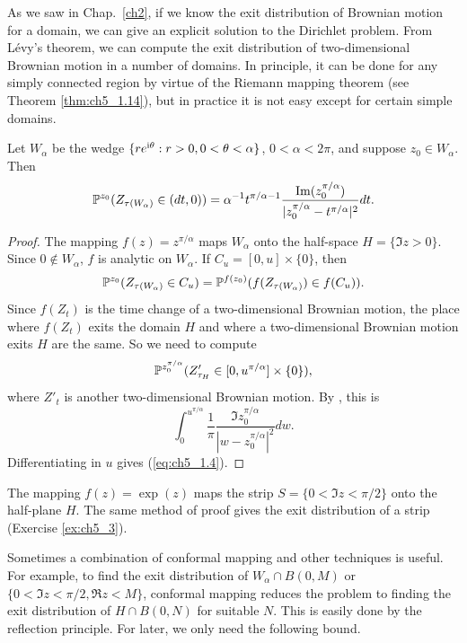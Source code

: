 

As we saw in Chap.\ \ref{ch2}, if we know the exit distribution of Brownian motion for a domain, we can give an explicit solution to the Dirichlet problem. From L\'evy's theorem, we can compute the exit distribution of two-dimensional Brownian motion in a number of domains. In principle, it can be done for any simply connected region by virtue of the Riemann mapping theorem (see Theorem \ref{thm:ch5_1.14}), but in practice it is not easy except for certain simple domains.

\begin{proposition}\label{prop:ch5_1.4}
Let $W_\alpha$ be the wedge $\{re^{\im\theta} : r > 0, 0 < \theta < \alpha\}$, $0 < \alpha < 2\pi$, and suppose $z_0 \in W_\alpha$. Then
\begin{equation}\label{eq:ch5_1.4}
    \P^{z_0}(Z_{\tau(W_\alpha)} \in (dt,0)) = \alpha^{-1}t^{\pi/\alpha-1}\frac{\Im(z_0^{\pi/\alpha})}{|z_0^{\pi/\alpha} - t^{\pi/\alpha}|^2}dt.
\end{equation}
\end{proposition}

\begin{proof}
The mapping $f(z) = z^{\pi/\alpha}$ maps $W_\alpha$ onto the half-space $H = \{\Im z > 0\}$. Since $0 \notin W_\alpha$, $f$ is analytic on $W_\alpha$. If $C_u = [0,u] \times \{0\}$, then
\[
    \P^{z_0}(Z_{\tau(W_\alpha)} \in C_u) = \P^{f(z_0)}(f(Z_{\tau(W_\alpha)}) \in f(C_u)).
\]
Since $f(Z_t)$ is the time change of a two-dimensional Brownian motion, the place where $f(Z_t)$ exits the domain $H$ and where a two-dimensional Brownian motion exits $H$ are the same. So we need to compute
\mpagebreak
\[
    \P^{z_0^{\pi/\alpha}}(Z'_{\tau_H} \in [0,u^{\pi/\alpha}] \times \{0\}),
\]
where $Z'_t$ is another two-dimensional Brownian motion. By , this is
\[
    \int_0^{u^{\pi/\alpha}} \frac{1}{\pi} \frac{\Im z_0^{\pi/\alpha}}{|w - z_0^{\pi/\alpha}|^2}dw.
\]
Differentiating in $u$ gives (\ref{eq:ch5_1.4}).
\end{proof}

The mapping $f(z) = \exp(z)$ maps the strip $S = \{0 < \Im z < \pi/2\}$ onto the half-plane $H$. The same method of proof gives the exit distribution of a strip (Exercise \ref{ex:ch5_3}).

Sometimes a combination of conformal mapping and other techniques is useful. For example, to find the exit distribution of $W_\alpha \cap B(0,M)$ or $\{0 < \Im z < \pi/2, \Re z < M\}$, conformal mapping reduces the problem to finding the exit distribution of $H \cap B(0,N)$ for suitable $N$. This is easily done by the reflection principle. For later, we only need the following bound.

